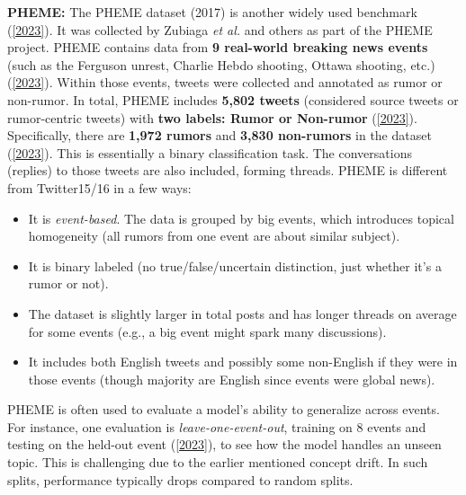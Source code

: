 \documentclass[12pt,a4paper]{report}
\begin{document}
\textbf{PHEME:} The PHEME dataset (2017) is another widely used benchmark (\href{https://aclanthology.org/2023.findings-eacl.55.pdf#:~:text=Twitter%2015%20and%20Twitter%2016%3A,dataset%20includes%204%2C664%20verified%20posts}{[2023]}). It was collected by Zubiaga \textit{et al.} and others as part of the PHEME project. PHEME contains data from \textbf{9 real-world breaking news events} (such as the Ferguson unrest, Charlie Hebdo shooting, Ottawa shooting, etc.) (\href{https://aclanthology.org/2023.findings-eacl.55.pdf#:~:text=PHEME%3A%20This%20benchmark%20contains%205%2C802,Rumor%20%28Zubiaga%20et%20al.%2C%202016}{[2023]}). Within those events, tweets were collected and annotated as rumor or non-rumor. In total, PHEME includes \textbf{5,802 tweets} (considered source tweets or rumor-centric tweets) with \textbf{two labels: Rumor or Non-rumor} (\href{https://aclanthology.org/2023.findings-eacl.55.pdf#:~:text=PHEME%3A%20This%20benchmark%20contains%205%2C802,Rumor%20%28Zubiaga%20et%20al.%2C%202016}{[2023]}). Specifically, there are \textbf{1,972 rumors} and \textbf{3,830 non-rumors} in the dataset (\href{https://aclanthology.org/2023.findings-eacl.55.pdf#:~:text=PHEME%3A%20This%20benchmark%20contains%205%2C802,Rumor%20%28Zubiaga%20et%20al.%2C%202016}{[2023]}). This is essentially a binary classification task. The conversations (replies) to those tweets are also included, forming threads. PHEME is different from Twitter15/16 in a few ways:
\begin{itemize}[leftmargin=1.2cm]
    \item It is \textit{event-based}. The data is grouped by big events, which introduces topical homogeneity (all rumors from one event are about similar subject).
    \item It is binary labeled (no true/false/uncertain distinction, just whether it’s a rumor or not).
    \item The dataset is slightly larger in total posts and has longer threads on average for some events (e.g., a big event might spark many discussions).
    \item It includes both English tweets and possibly some non-English if they were in those events (though majority are English since events were global news).
\end{itemize}
PHEME is often used to evaluate a model’s ability to generalize across events. For instance, one evaluation is \textit{leave-one-event-out}, training on 8 events and testing on the held-out event (\href{https://aclanthology.org/2023.findings-eacl.55.pdf#:~:text=We%20observe%20that%20the%20LOO,identical%20text%20content%20sampled%20from}{[2023]}), to see how the model handles an unseen topic. This is challenging due to the earlier mentioned concept drift. In such splits, performance typically drops compared to random splits.
\end{document}
